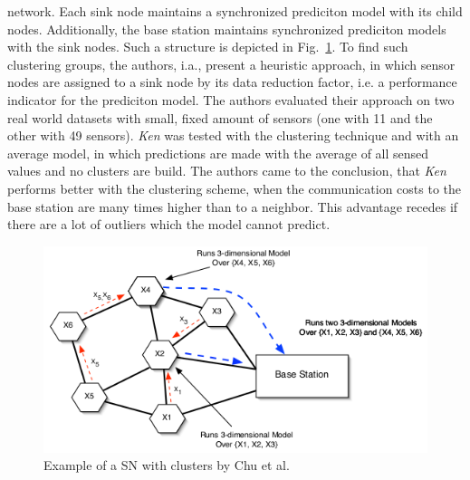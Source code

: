 network. Each sink node maintains a synchronized prediciton model with its
child nodes. Additionally, the base station maintains synchronized prediciton
models with the sink nodes. Such a structure is depicted in
Fig.~\ref{fig:cluster Chu}. To find such clustering groups, the authors, i.a.,
present a heuristic approach, in which sensor nodes are assigned to a sink node
by its data reduction factor, i.e. a performance indicator for the prediciton
model. The authors evaluated their approach on two real world datasets with
small, fixed amount of sensors (one with 11 and the other with 49 sensors).
\textit{Ken} was tested with the clustering technique and with an average
model, in which predictions are made with the average of all sensed values and
no clusters are build. The authors came to the conclusion, that \textit{Ken}
performs better with the clustering scheme, when the communication costs to the
base station are many times higher than to a neighbor. This advantage recedes if
there are a lot of outliers which the model cannot predict.

\begin{figure}[h]
\includegraphics[width=\linewidth]{images/ken-clustering.png}
\caption{Example of a \ac{SN} with clusters by Chu et al.~\cite{chu2006approximate}}
\label{fig:cluster Chu}
\centering
\end{figure}

